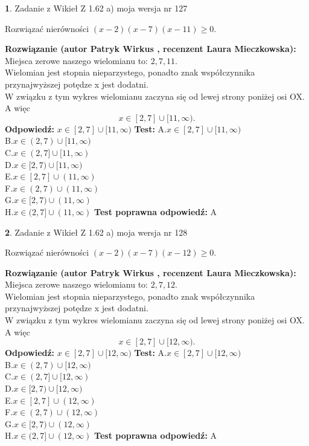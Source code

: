 \documentclass[12pt, a4paper]{article}
\theoremstyle{definition} %
\newtheorem{zad}{}
\newcommand{\zadStart}[1]{\begin{zad}#1\newline}
\newcommand{\zadStop}{\end{zad}}
\newcommand{\rozwStart}[2]{\noindent \textbf{Rozwiązanie (autor #1 , recenzent #2): }\newline}
\newcommand{\rozwStop}{\newline}
\newcommand{\odpStart}{\noindent \textbf{Odpowiedź:}\newline}
\newcommand{\odpStop}{\newline}
\newcommand{\testStart}{\noindent \textbf{Test:}\newline}
\newcommand{\testStop}{\newline}
\newcommand{\kluczStart}{\noindent \textbf{Test poprawna odpowiedź:}\newline}
\newcommand{\kluczStop}{\newline}
\begin{document}
\zadStart{Zadanie z Wikieł Z 1.62 a) moja wersja nr 127}

Rozwiązać nierówności $(x-2)(x-7)(x-11)\ge0$.
\zadStop
\rozwStart{Patryk Wirkus}{Laura Mieczkowska}
Miejsca zerowe naszego wielomianu to: $2, 7, 11$.\\
Wielomian jest stopnia nieparzystego, ponadto znak współczynnika przy\linebreak najwyższej potędze x jest dodatni.\\ W związku z tym wykres wielomianu zaczyna się od lewej strony poniżej osi OX. A więc $$x \in [2,7] \cup [11,\infty).$$
\rozwStop
\odpStart
$x \in [2,7] \cup [11,\infty)$
\odpStop
\testStart
A.$x \in [2,7] \cup [11,\infty)$\\
B.$x \in (2,7) \cup [11,\infty)$\\
C.$x \in (2,7] \cup [11,\infty)$\\
D.$x \in [2,7) \cup [11,\infty)$\\
E.$x \in [2,7] \cup (11,\infty)$\\
F.$x \in (2,7) \cup (11,\infty)$\\
G.$x \in [2,7) \cup (11,\infty)$\\
H.$x \in (2,7] \cup (11,\infty)$
\testStop
\kluczStart
A
\kluczStop



\zadStart{Zadanie z Wikieł Z 1.62 a) moja wersja nr 128}

Rozwiązać nierówności $(x-2)(x-7)(x-12)\ge0$.
\zadStop
\rozwStart{Patryk Wirkus}{Laura Mieczkowska}
Miejsca zerowe naszego wielomianu to: $2, 7, 12$.\\
Wielomian jest stopnia nieparzystego, ponadto znak współczynnika przy\linebreak najwyższej potędze x jest dodatni.\\ W związku z tym wykres wielomianu zaczyna się od lewej strony poniżej osi OX. A więc $$x \in [2,7] \cup [12,\infty).$$
\rozwStop
\odpStart
$x \in [2,7] \cup [12,\infty)$
\odpStop
\testStart
A.$x \in [2,7] \cup [12,\infty)$\\
B.$x \in (2,7) \cup [12,\infty)$\\
C.$x \in (2,7] \cup [12,\infty)$\\
D.$x \in [2,7) \cup [12,\infty)$\\
E.$x \in [2,7] \cup (12,\infty)$\\
F.$x \in (2,7) \cup (12,\infty)$\\
G.$x \in [2,7) \cup (12,\infty)$\\
H.$x \in (2,7] \cup (12,\infty)$
\testStop
\kluczStart
A
\kluczStop
\end{document}
